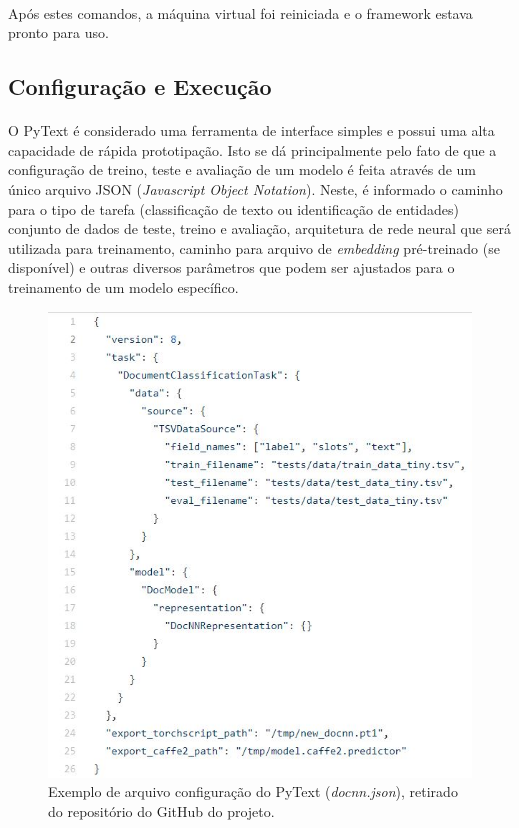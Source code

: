 \documentclass[grad,numbers]{coppe}
\begin{document}
			\paragraph{}Após estes comandos, a máquina virtual foi reiniciada e o framework estava pronto para uso.
  	\subsection{Configuração e Execução}
  		\paragraph{}O PyText é considerado uma ferramenta de interface simples e possui uma alta capacidade de rápida prototipação\cite{pytext-paper}. Isto se dá principalmente pelo fato de que a configuração de treino, teste e avaliação de um modelo é feita através de um único arquivo JSON (\textit{Javascript Object Notation}). Neste, é informado o caminho para o tipo de tarefa (classificação de texto ou identificação de entidades) conjunto de dados de teste, treino e avaliação, arquitetura de rede neural que será utilizada para treinamento, caminho para arquivo de \textit{embedding} pré-treinado (se disponível) e outras diversos parâmetros que podem ser ajustados para o treinamento de um modelo específico.
 			\begin{figure}[h]
			{\includegraphics[width=15cm]{pytext-config-ex.jpg}
				\caption{Exemplo de arquivo configuração do PyText (\textit{docnn.json}), retirado do repositório do GitHub do projeto\cite{pytext-github}.}
				\label{fig:pytext-config-ex-fig}}
			\end{figure}
\end{document}
